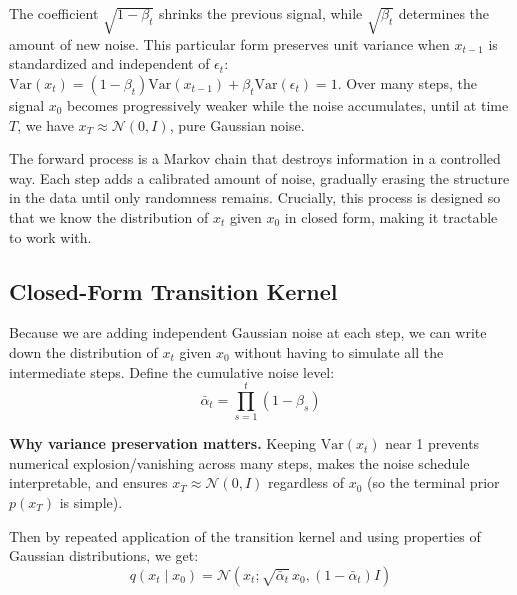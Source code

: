 \vspPara

The coefficient $\sqrt{1 - \beta_t}$ shrinks the previous signal, while $\sqrt{\beta_t}$ determines the amount of new noise. This particular form preserves unit variance when $x_{t-1}$ is standardized and independent of $\epsilon_t$: $\mathrm{Var}(x_t)=(1-\beta_t)\mathrm{Var}(x_{t-1})+\beta_t\mathrm{Var}(\epsilon_t)=1$. Over many steps, the signal $x_0$ becomes progressively weaker while the noise accumulates, until at time $T$, we have $x_T \approx \mathcal{N}(0, I)$, pure Gaussian noise.

\vspSection

\begin{keyinsight}
The forward process is a Markov chain that destroys information in a controlled way. Each step adds a calibrated amount of noise, gradually erasing the structure in the data until only randomness remains. Crucially, this process is designed so that we know the distribution of $x_t$ given $x_0$ in closed form, making it tractable to work with.
\end{keyinsight}

\vspSection


\subsection{Closed-Form Transition Kernel}

Because we are adding independent Gaussian noise at each step, we can write down the distribution of $x_t$ given $x_0$ without having to simulate all the intermediate steps. Define the cumulative noise level:
%
\begin{equation}
\bar{\alpha}_t = \prod_{s=1}^t (1 - \beta_s)
\end{equation}

\vspPara

\textbf{Why variance preservation matters.} Keeping $\mathrm{Var}(x_t)$ near 1 prevents numerical explosion/vanishing across many steps, makes the noise schedule interpretable, and ensures $x_T\approx\mathcal{N}(0,I)$ regardless of $x_0$ (so the terminal prior $p(x_T)$ is simple).

\vspPara

Then by repeated application of the transition kernel and using properties of Gaussian distributions, we get:
%
\begin{equation}
q(x_t \mid x_0) = \mathcal{N}(x_t; \sqrt{\bar{\alpha}_t} \, x_0, (1 - \bar{\alpha}_t) I)
\end{equation}

